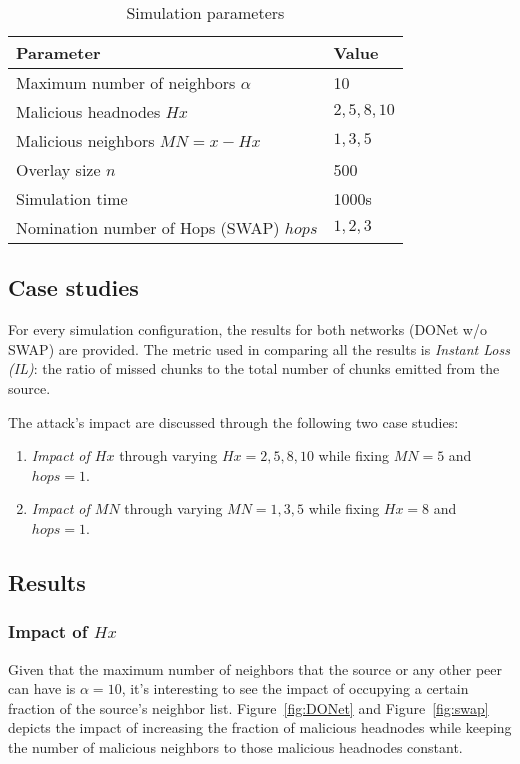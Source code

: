 \begin{table}
\centering
\caption{Simulation parameters}
\begin{tabular}{|l|l|}
\hline
\bf{Parameter} & \bf{Value} \\\hline\hline
Maximum number of neighbors $\alpha$ & 10\\
\hline
Malicious headnodes $Hx$ & ${2,5,8,10}$ \\
 \hline
Malicious neighbors $MN=x-Hx$ & ${1,3,5}$ \\
 \hline
 Overlay size $n$ & 500 \\
 \hline
Simulation time & 1000s\\
\hline
Nomination number of Hops (SWAP) $hops$ & ${1,2,3}$\\
\hline
\end{tabular}

\label{tab:SM-Parameters}
 
\end{table}

\subsection{Case studies}
For every simulation configuration, the results for both networks (DONet w/o SWAP) are provided. 
The metric used in comparing all the results is \emph{Instant Loss (IL)}: the ratio of missed chunks to the total number of chunks emitted from the source.

The attack's impact are discussed through the following two case studies:
\begin{enumerate}
 \item \emph{Impact of $Hx$} through varying $Hx={2,5,8,10}$ while fixing $MN=5$ and $hops=1$.
 \item \emph{Impact of $MN$} through varying $MN={1,3,5}$ while fixing $Hx=8$ and $hops=1$.
 
\end{enumerate}


\subsection{Results}

\subsubsection*{Impact of $Hx$}
Given that the maximum number of neighbors that the source or any other peer can have is $\alpha =10$, it's interesting to see the impact of occupying a certain fraction of the source's neighbor list.
Figure~\ref{fig:DONet} and Figure~\ref{fig:swap} depicts the impact of increasing the fraction of malicious headnodes while keeping the number of malicious neighbors to those malicious headnodes constant.

